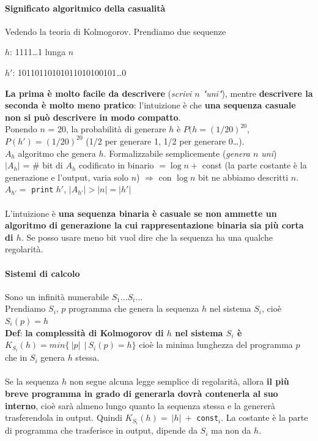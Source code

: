 \documentclass[10pt]{book}
\begin{document}
\paragraph{Significato algoritmico della casualità} Vedendo la teoria di Kolmogorov. Prendiamo due sequenze
\begin{list}{}{}
	\item $h$: 1111\ldots 1 lunga $n$
	\item $h'$: 10110110101011010100101\ldots 0
\end{list}
\textbf{La prima è molto facile da descrivere} (\textit{scrivi $n$ "uni"}), mentre \textbf{descrivere la seconda è molto meno pratico}: l'intuizione è che \textbf{una sequenza casuale non si può descrivere in modo compatto}.\\
Ponendo $n$ = 20, la probabilità di generare $h$ è $P(h = (1/20)^{20}$, $P(h') = (1/20)^{20}$ (1/2 per generare 1, 1/2 per generare 0\ldots).\\
$A_h$ algoritmo che genera $h$. Formalizzabile semplicemente (\textit{genera $n$ uni})\\
$|A_h|$ = $\#$ bit di $A_h$ codificato in binario $= \log n +$ const (la parte costante è la generazione e l'output, varia solo $n$) $\Rightarrow$ con $\log n$ bit ne abbiamo descritti $n$.\\
$A_{h'} =$ \texttt{print} $h'$, $|A_{h'}| > |n| = |h'|$\\\\
L'intuizione è \textbf{una sequenza binaria è casuale se non ammette un algoritmo di generazione la cui rappresentazione binaria sia più corta di $h$}. Se posso usare meno bit vuol dire che la sequenza ha una qualche regolarità.
\paragraph{Sistemi di calcolo} Sono un infinità numerabile $S_1\ldots S_i\ldots$\\
Prendiamo $S_i$, $p$ programma che genera la sequenza $h$ nel sistema $S_i$, cioè $S_i(p) = h$\\
\textbf{Def}: \textbf{la complessità di Kolmogorov di $h$ nel sistema $S_i$ è $K_{S_i}(h) = min\{\:|p|\: \:|\: S_i(p) = h\}$} cioè la minima lunghezza del programma $p$ che in $S_i$ genera $h$ stessa.\\\\
Se la sequenza $h$ non segue alcuna legge semplice di regolarità, allora \textbf{il più breve programma in grado di generarla dovrà contenerla al suo interno}, cioè sarà almeno lungo quanto la sequenza stessa e la genererà trasferendola in output. Quindi $K_{S_i}(h) = \:|h|\: +$ \texttt{const}$_i$. La costante è la parte di programma che trasferisce in output, dipende da $S_i$ ma non da $h$.
\end{document}
